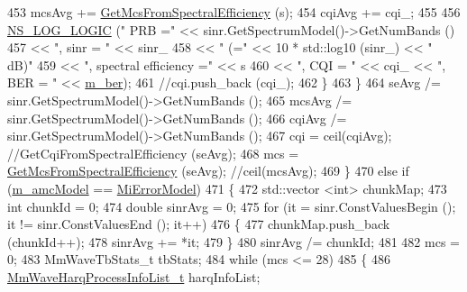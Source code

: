 \begin{DoxyCode}
453                                 mcsAvg += \hyperlink{classns3_1_1MmWaveAmc_a3632ed497ab17df876e281a823f0450c}{GetMcsFromSpectralEfficiency} (s);
454                                 cqiAvg += cqi\_;
455 
456                                 \hyperlink{group__logging_ga88acd260151caf2db9c0fc84997f45ce}{NS\_LOG\_LOGIC} (\textcolor{stringliteral}{" PRB ="} << sinr.GetSpectrumModel()->GetNumBands 
      ()
457                                               << \textcolor{stringliteral}{", sinr = "} << sinr\_
458                                               << \textcolor{stringliteral}{" (="} << 10 * std::log10 (sinr\_) << \textcolor{stringliteral}{" dB)"}
459                                               << \textcolor{stringliteral}{", spectral efficiency ="} << s
460                                               << \textcolor{stringliteral}{", CQI = "} << cqi\_ << \textcolor{stringliteral}{", BER = "} << 
      \hyperlink{classns3_1_1MmWaveAmc_ac0e911c1ebab08ab7c52713ea5b35a15}{m\_ber});
461                                 \textcolor{comment}{//cqi.push\_back (cqi\_);}
462                         \}
463                 \}
464                 seAvg /= sinr.GetSpectrumModel()->GetNumBands ();
465                 mcsAvg /= sinr.GetSpectrumModel()->GetNumBands ();
466                 cqiAvg /= sinr.GetSpectrumModel()->GetNumBands ();
467                 cqi = ceil(cqiAvg); \textcolor{comment}{//GetCqiFromSpectralEfficiency (seAvg);}
468                 mcs = \hyperlink{classns3_1_1MmWaveAmc_a3632ed497ab17df876e281a823f0450c}{GetMcsFromSpectralEfficiency} (seAvg); \textcolor{comment}{//ceil(mcsAvg);}
469         \}
470         \textcolor{keywordflow}{else} \textcolor{keywordflow}{if} (\hyperlink{classns3_1_1MmWaveAmc_a4518d21ebad09825dd22466951c6935b}{m\_amcModel} == \hyperlink{classns3_1_1MmWaveAmc_a2805c1e6b48cb88e9cf86b062e079401ac8de076cfbfb1280afab7b9590e00151}{MiErrorModel})
471         \{
472                 std::vector <int> chunkMap;
473                 \textcolor{keywordtype}{int} chunkId = 0;
474                 \textcolor{keywordtype}{double} sinrAvg = 0;
475                 \textcolor{keywordflow}{for} (it = sinr.ConstValuesBegin (); it != sinr.ConstValuesEnd (); it++)
476                 \{
477                         chunkMap.push\_back (chunkId++);
478                         sinrAvg += *it;
479                 \}
480                 sinrAvg /= chunkId;
481 
482                 mcs = 0;
483                 MmWaveTbStats\_t tbStats;
484                 \textcolor{keywordflow}{while} (mcs <= 28)
485                 \{
486                         \hyperlink{namespacens3_aca7c6bab455c2515f3e437749b5e904d}{MmWaveHarqProcessInfoList\_t} harqInfoList;

\end{DoxyCode}

